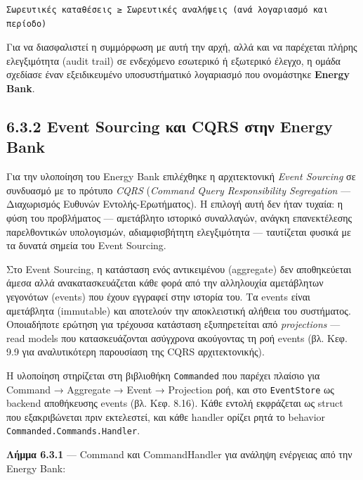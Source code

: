 \begin{verbatim}
Σωρευτικές καταθέσεις ≥ Σωρευτικές αναλήψεις (ανά λογαριασμό και περίοδο)
\end{verbatim}

Για να διασφαλιστεί η συμμόρφωση με αυτή την αρχή, αλλά και να παρέχεται
πλήρης ελεγξιμότητα (audit trail) σε ενδεχόμενο εσωτερικό ή εξωτερικό
έλεγχο, η ομάδα σχεδίασε έναν εξειδικευμένο υποσυστήματικό λογαριασμό
που ονομάστηκε \textbf{Energy Bank}.

\subsection{6.3.2 Event Sourcing και CQRS στην Energy
Bank}\label{event-sourcing-ux3baux3b1ux3b9-cqrs-ux3c3ux3c4ux3b7ux3bd-energy-bank}

Για την υλοποίηση του Energy Bank επιλέχθηκε η αρχιτεκτονική \emph{Event
Sourcing} σε συνδυασμό με το πρότυπο \emph{CQRS} (\emph{Command Query
Responsibility Segregation} --- Διαχωρισμός Ευθυνών Εντολής-Ερωτήματος).
Η επιλογή αυτή δεν ήταν τυχαία: η φύση του προβλήματος --- αμετάβλητο
ιστορικό συναλλαγών, ανάγκη επανεκτέλεσης παρελθοντικών υπολογισμών,
αδιαμφισβήτητη ελεγξιμότητα --- ταυτίζεται φυσικά με τα δυνατά σημεία
του Event Sourcing.

Στο Event Sourcing, η κατάσταση ενός αντικειμένου (aggregate) δεν
αποθηκεύεται άμεσα αλλά ανακατασκευάζεται κάθε φορά από την αλληλουχία
αμετάβλητων γεγονότων (events) που έχουν εγγραφεί στην ιστορία του. Τα
events είναι αμετάβλητα (immutable) και αποτελούν την αποκλειστική
αλήθεια του συστήματος. Οποιαδήποτε ερώτηση για τρέχουσα κατάσταση
εξυπηρετείται από \emph{projections} --- read models που κατασκευάζονται
ασύγχρονα ακούγοντας τη ροή events (βλ. Κεφ. 9.9 για αναλυτικότερη
παρουσίαση της CQRS αρχιτεκτονικής).

Η υλοποίηση στηρίζεται στη βιβλιοθήκη \texttt{Commanded} που παρέχει
πλαίσιο για Command → Aggregate → Event → Projection ροή, και στο
\texttt{EventStore} ως backend αποθήκευσης events (βλ. Κεφ. 8.16). Κάθε
εντολή εκφράζεται ως struct που εξακριβώνεται πριν εκτελεστεί, και κάθε
handler ορίζει ρητά το behavior \texttt{Commanded.Commands.Handler}.

\textbf{Λήμμα 6.3.1} --- Command και CommandHandler για ανάληψη
ενέργειας από την Energy Bank:

